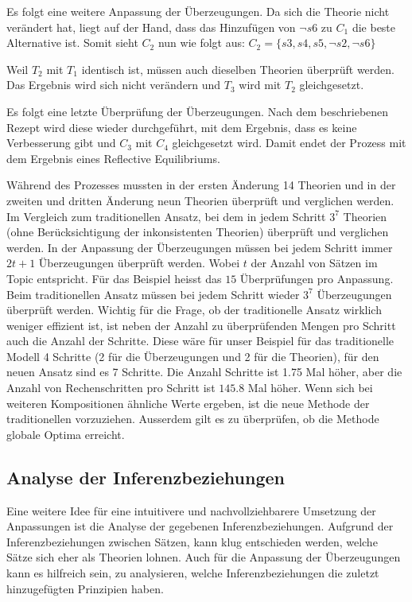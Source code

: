 \documentclass{article}
\begin{document}
 Es folgt eine weitere Anpassung der Überzeugungen. Da sich die Theorie nicht verändert hat, liegt auf der Hand, dass das Hinzufügen von $\neg s6$ zu $C_1$ die beste Alternative ist. Somit sieht $C_2$ nun wie folgt aus: $C_2 = \{s3, s4, s5, \neg s2, \neg s6\}$
 
 Weil $T_2$ mit $T_1$ identisch ist, müssen auch dieselben Theorien überprüft werden. Das Ergebnis wird sich nicht verändern und $T_3$ wird mit $T_2$ gleichgesetzt.
 
 Es folgt eine letzte Überprüfung der Überzeugungen. Nach dem beschriebenen Rezept wird diese wieder durchgeführt, mit dem Ergebnis, dass es keine Verbesserung gibt und $C_3$ mit $C_4$ gleichgesetzt wird. Damit endet der Prozess mit dem Ergebnis eines Reflective Equilibriums.
 
 Während des Prozesses mussten in der ersten Änderung 14 Theorien und in der zweiten und dritten Änderung neun Theorien überprüft und verglichen werden.  Im Vergleich zum traditionellen Ansatz, bei dem in jedem Schritt $3^7$ Theorien (ohne Berücksichtigung der inkonsistenten Theorien) überprüft und verglichen werden. In der Anpassung der Überzeugungen müssen bei jedem Schritt immer $2t + 1$ Überzeugungen überprüft werden. Wobei $t$ der Anzahl von Sätzen im Topic entspricht. Für das Beispiel heisst das $15$ Überprüfungen pro Anpassung. Beim traditionellen Ansatz müssen bei jedem Schritt wieder $3^7$ Überzeugungen überprüft werden. Wichtig für die Frage, ob der traditionelle Ansatz wirklich weniger effizient ist, ist neben der Anzahl zu überprüfenden Mengen pro Schritt auch die Anzahl der Schritte. Diese wäre für unser Beispiel für das traditionelle Modell 4 Schritte (2 für die Überzeugungen und 2 für die Theorien), für den neuen Ansatz sind es 7 Schritte. Die Anzahl Schritte ist 1.75 Mal höher, aber die Anzahl von Rechenschritten pro Schritt ist $145.8$ Mal höher. Wenn sich bei weiteren Kompositionen ähnliche Werte ergeben, ist die neue Methode der traditionellen vorzuziehen. Ausserdem gilt es zu überprüfen, ob die Methode globale Optima erreicht.

\subsection{Analyse der Inferenzbeziehungen}
Eine weitere Idee für eine intuitivere und nachvollziehbarere Umsetzung der Anpassungen ist die Analyse der gegebenen Inferenzbeziehungen. Aufgrund der Inferenzbeziehungen zwischen Sätzen, kann klug entschieden werden, welche Sätze sich eher als Theorien lohnen. Auch für die Anpassung der Überzeugungen kann es hilfreich sein, zu analysieren, welche Inferenzbeziehungen die zuletzt hinzugefügten Prinzipien haben.
\end{document}
